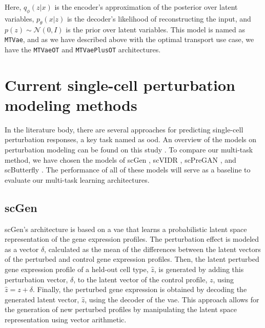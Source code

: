 \documentclass[12pt, a4paper]{article}
\begin{document}
Here, $q_\phi(z|x)$ is the encoder's approximation of the posterior over latent variables, $p_\theta(x|z)$ is the decoder's likelihood of reconstructing the input, and $p(z) \sim \mathcal{N}(0, I)$ is the prior over latent variables. This model is named as \verb|MTVae|, and as we have described above with the optimal transport use case, we have the \verb|MTVaeOT| and \verb|MTVaePlusOT| architectures.



\section{Current single-cell perturbation modeling methods}

In the literature body, there are several approaches for predicting single-cell perturbation responses, a key task named as \gls{ood}. An overview of the models on perturbation modeling can be found on this study \cite{gavriilidisMinireviewPerturbationModelling2024}. To compare our multi-task method, we have chosen the models of scGen \cite{lotfollahiScGenPredictsSinglecell2019}, scVIDR \cite{kanaGenerativeModelingSinglecell2023}, scPreGAN \cite{weiScPreGANDeepGenerative2022}, and scButterfly \cite{caoScButterflyVersatileSinglecell2024}.
The performance of all of these models will serve as a baseline to evaluate our multi-task learning architectures.

\subsection{scGen}

scGen's architecture is based on a \gls{vae} that learns a probabilistic latent space representation of the gene expression profiles. 
The perturbation effect is modeled as a vector $\delta$, calculated as the mean of the differences between the latent vectors of the perturbed and control gene expression profiles. Then, the latent perturbed gene expression profile of a held-out cell type, $\hat{z}$,  is generated by adding this perturbation vector, $\delta$, to the latent vector of the control profile, $z$, using $\hat{z} = z + \delta$. Finally, the perturbed gene expression is obtained by decoding the generated latent vector, $\hat{z}$, using the decoder of the \gls{vae}. This approach allows for the generation of new perturbed profiles by manipulating the latent space representation using vector arithmetic.
\end{document}
